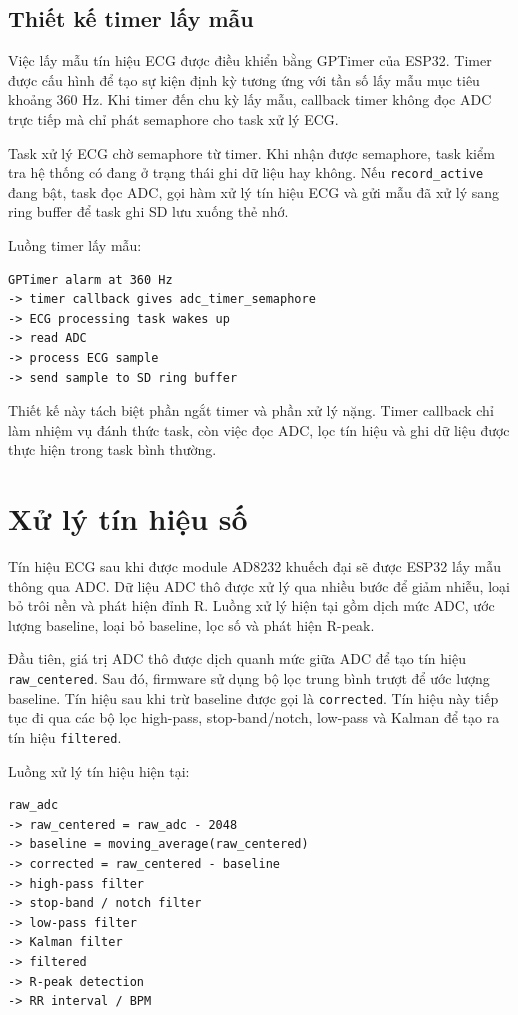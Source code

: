 \subsection{Thiết kế timer lấy mẫu}

Việc lấy mẫu tín hiệu ECG được điều khiển bằng GPTimer của ESP32. Timer được
cấu hình để tạo sự kiện định kỳ tương ứng với tần số lấy mẫu mục tiêu khoảng
360 Hz. Khi timer đến chu kỳ lấy mẫu, callback timer không đọc ADC trực tiếp mà
chỉ phát semaphore cho task xử lý ECG.

Task xử lý ECG chờ semaphore từ timer. Khi nhận được semaphore, task kiểm tra
hệ thống có đang ở trạng thái ghi dữ liệu hay không. Nếu \texttt{record\_active}
đang bật, task đọc ADC, gọi hàm xử lý tín hiệu ECG và gửi mẫu đã xử lý sang
ring buffer để task ghi SD lưu xuống thẻ nhớ.

Luồng timer lấy mẫu:

\begin{verbatim}
GPTimer alarm at 360 Hz
-> timer callback gives adc_timer_semaphore
-> ECG processing task wakes up
-> read ADC
-> process ECG sample
-> send sample to SD ring buffer
\end{verbatim}

Thiết kế này tách biệt phần ngắt timer và phần xử lý nặng. Timer callback chỉ
làm nhiệm vụ đánh thức task, còn việc đọc ADC, lọc tín hiệu và ghi dữ liệu được
thực hiện trong task bình thường.

\section{Xử lý tín hiệu số}

Tín hiệu ECG sau khi được module AD8232 khuếch đại sẽ được ESP32 lấy mẫu thông
qua ADC. Dữ liệu ADC thô được xử lý qua nhiều bước để giảm nhiễu, loại bỏ trôi
nền và phát hiện đỉnh R. Luồng xử lý hiện tại gồm dịch mức ADC, ước lượng
baseline, loại bỏ baseline, lọc số và phát hiện R-peak.

Đầu tiên, giá trị ADC thô được dịch quanh mức giữa ADC để tạo tín hiệu
\texttt{raw\_centered}. Sau đó, firmware sử dụng bộ lọc trung bình trượt để
ước lượng baseline. Tín hiệu sau khi trừ baseline được gọi là
\texttt{corrected}. Tín hiệu này tiếp tục đi qua các bộ lọc high-pass,
stop-band/notch, low-pass và Kalman để tạo ra tín hiệu \texttt{filtered}.

Luồng xử lý tín hiệu hiện tại:

\begin{verbatim}
raw_adc
-> raw_centered = raw_adc - 2048
-> baseline = moving_average(raw_centered)
-> corrected = raw_centered - baseline
-> high-pass filter
-> stop-band / notch filter
-> low-pass filter
-> Kalman filter
-> filtered
-> R-peak detection
-> RR interval / BPM
\end{verbatim}

